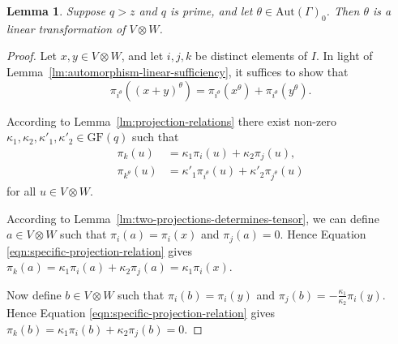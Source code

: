 \documentclass[10pt]{amsart}
\theoremstyle{definition}
\theoremstyle{plain}
\newtheorem{lemma}[lemma]{Lemma}
\theoremstyle{plain}
\theoremstyle{plain}
\theoremstyle{plain}
\newcommand{\Aut}{\mathrm{Aut}}
\newcommand{\GF}{\mathrm{GF}}
\begin{document}
\begin{lemma} \label{lm:automorphism-stabiliser-linear}
Suppose $q > z$ and $q$ is prime, and let $\theta \in \Aut{\left(\Gamma \right)}_0$. Then $\theta$ is a linear transformation of $V \otimes W$.
\end{lemma}
\begin{proof}
Let $x, y \in V \otimes W$, and let $i, j, k$ be distinct elements of $I$. In light of Lemma~\ref{lm:automorphism-linear-sufficiency}, it suffices to show that
\begin{displaymath}
    \pi_{i^\theta}{\left(\left(x + y \right)^\theta \right)} = \pi_{i^\theta}{\left(x^\theta \right)} + \pi_{i^\theta}{\left(y^\theta \right)}.
\end{displaymath}

According to Lemma~\ref{lm:projection-relations} there exist non-zero $\kappa_1, \kappa_2, \kappa'_1, \kappa'_2 \in \GF{\left(q \right)}$ such that
\begin{align}
    \pi_k{\left(u \right)} &= \kappa_1 \pi_i{\left(u \right)} + \kappa_2 \pi_j{\left(u \right)}, \label{eqn:specific-projection-relation} \\
    \pi_{k^\theta}{\left(u \right)} &= \kappa'_1 \pi_{i^\theta}{\left(u \right)} + \kappa'_2 \pi_{j^\theta}{\left(u \right)} \label{eqn:specific-projection-relation-image}
\end{align}
for all $u \in V \otimes W$.

According to Lemma~\ref{lm:two-projections-determines-tensor}, we can define $a \in V \otimes W$ such that $\pi_i{\left(a \right)} = \pi_i{\left(x \right)}$ and $\pi_j{\left(a \right)} = 0$. Hence Equation \eqref{eqn:specific-projection-relation} gives $\pi_k{\left(a \right)} = \kappa_1 \pi_i{\left(a \right)} + \kappa_2 \pi_j{\left(a \right)} = \kappa_1 \pi_i{\left(x \right)}$.

Now define $b \in V \otimes W$ such that $\pi_i{\left(b \right)} = \pi_i{\left(y \right)}$ and $\pi_j{\left(b \right)} = -\frac{\kappa_1}{\kappa_2} \pi_i{\left(y \right)}$. Hence Equation \eqref{eqn:specific-projection-relation} gives $\pi_k{\left(b \right)} = \kappa_1 \pi_i{\left(b \right)} + \kappa_2 \pi_j{\left(b \right)} = 0$.


\end{proof}
\end{document}
